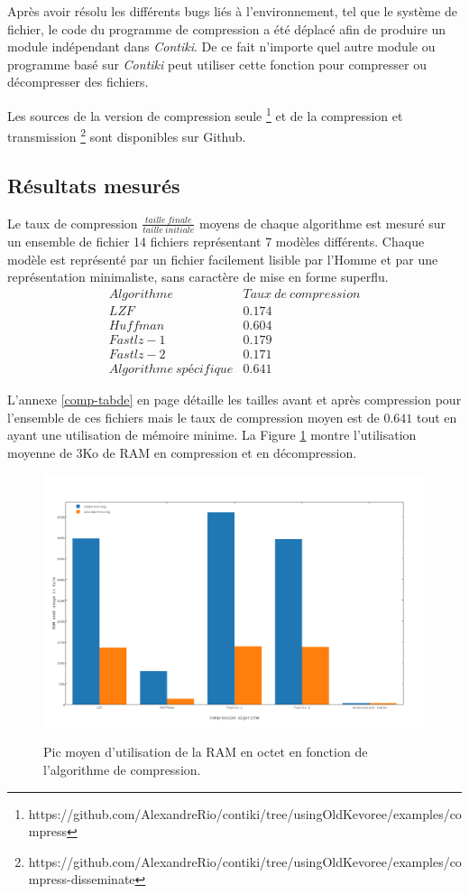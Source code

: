 Après avoir résolu les différents bugs liés à l'environnement, tel que le système de fichier, le code du programme de compression a été déplacé afin de produire un module indépendant dans \emph{Contiki}. De ce fait n'importe quel autre module ou programme basé sur \emph{Contiki} peut utiliser cette fonction pour compresser ou décompresser des fichiers.

Les sources de la version de compression seule \footnote{https://github.com/AlexandreRio/contiki/tree/usingOldKevoree/examples/compress} et de la compression et transmission \footnote{https://github.com/AlexandreRio/contiki/tree/usingOldKevoree/examples/compress-disseminate} sont disponibles sur Github.

\subsection{Résultats mesurés}

Le taux de compression $\frac{taille~finale}{taille~initiale}$ moyens de chaque algorithme est mesuré sur un ensemble de fichier 14 fichiers représentant 7 modèles différents. Chaque modèle est représenté par un fichier facilement lisible par l'Homme et par une représentation minimaliste, sans caractère de mise en forme superflu.
\[
\begin{array}{lc}
Algorithme & Taux~de~compression \\
LZF & 0.174 \\
Huffman & 0.604 \\
Fastlz-1 & 0.179 \\
Fastlz-2 & 0.171 \\
Algorithme~spécifique& 0.641
\end{array}
\]

L'annexe \ref{comp-tabde} en page \pageref{comp-tabde} détaille les tailles avant et après compression pour l'ensemble de ces fichiers mais le taux de compression moyen est de $0.641$ tout en ayant une utilisation de mémoire minime. La Figure \ref{comp-memory} montre l'utilisation moyenne de 3Ko de RAM en compression et en décompression.

\begin{figure}[ht!]
\centering
\includegraphics[scale=0.4]{images/comp-memory.png}
\label{comp-memory}
\caption{Pic moyen d'utilisation de la RAM en octet en fonction de l'algorithme de compression.}
\end{figure}

